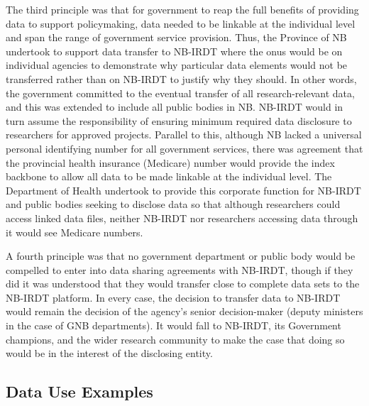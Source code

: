 The third principle was that for government to reap the full benefits of providing data to support policymaking, data needed to be linkable at the individual level and span the range of government service provision. Thus, the Province of NB undertook to support data transfer to NB-IRDT where the onus would be on individual agencies to demonstrate why particular data elements would not be transferred rather than on NB-IRDT to justify why they should. In other words, the government committed to the eventual transfer of all research-relevant data, and this was extended to include all public bodies in NB. NB-IRDT would in turn assume the responsibility of ensuring minimum required data disclosure to researchers for approved projects. Parallel to this, although NB lacked a universal personal identifying number for all government services, there was agreement that the provincial health insurance (Medicare) number would provide the index backbone to allow all data to be made linkable at the individual level. The Department of Health undertook to provide this corporate function for NB-IRDT and public bodies seeking to disclose data so that although researchers could access linked data files, neither NB-IRDT nor researchers accessing data through it would see Medicare numbers.

A fourth principle was that no government department or public body would be compelled to enter into data sharing agreements with NB-IRDT, though if they did it was understood that they would transfer close to complete data sets to the NB-IRDT platform. In every case, the decision to transfer data to NB-IRDT would remain the decision of the agency's senior decision-maker (deputy ministers in the case of GNB departments). It would fall to NB-IRDT, its Government champions, and the wider research community to make the case that doing so would be in the interest of the disclosing entity.

\hypertarget{nbirdt-examples}{%
\subsection{Data Use Examples}\label{nbirdt-examples}}

